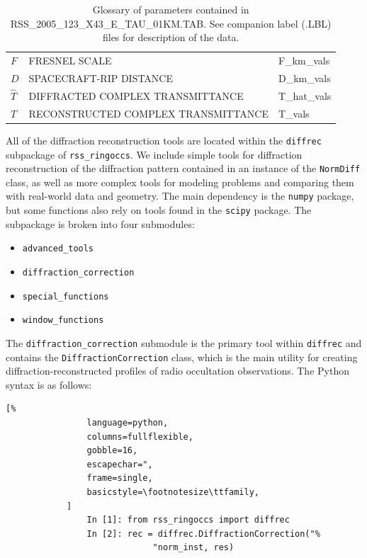 \documentclass[titlepage, 12pt]{article}
\begin{document}
\begin{table}[H]
{\begin{tabular}{l l l}
                        $F$&FRESNEL SCALE&F\_km\_vals\\
                        $D$&SPACECRAFT-RIP DISTANCE&D\_km\_vals\\
                        $\hat{T}$&DIFFRACTED COMPLEX TRANSMITTANCE&
                        T\_hat\_vals\\
                        $T$&RECONSTRUCTED COMPLEX TRANSMITTANCE&
                        T\_vals\\
                        \hline
                    \end{tabular}
                }
                \caption[Glossary of parameters in TAU file]{%
                    Glossary of parameters contained in
                    RSS\_2005\_123\_X43\_E\_TAU\_01KM.TAB.
                    See companion label
                    (.LBL) files for description of the data.
                }
                \label{tab:easydata_parameters_from_tau_file}
            \end{table}
            All of the diffraction reconstruction tools are located
            within the \texttt{diffrec} subpackage of
            \texttt{rss\_ringoccs}. We include simple tools for
            diffraction reconstruction of the diffraction
            pattern contained in an instance of the \texttt{NormDiff}
            class, as well as more complex tools for modeling problems
            and comparing them with real-world data and geometry.
            The main dependency is the \texttt{numpy} package,
            but some functions also rely on tools found in the
            \texttt{scipy} package. The subpackage is broken into four
            submodules:
            \begin{itemize}[itemsep=0pt]
                \item \texttt{advanced\_tools}
                \item \texttt{diffraction\_correction}
                \item \texttt{special\_functions}
                \item \texttt{window\_functions}
            \end{itemize}
            The \texttt{diffraction\_correction} submodule is the primary
            tool within \texttt{diffrec} and contains the
            \texttt{DiffractionCorrection} class, which is the main utility
            for creating diffraction-reconstructed profiles of radio occultation
            observations. The Python syntax is as follows:
            \begin{lstlisting}[%
                language=python,
                columns=fullflexible,
                gobble=16,
                escapechar=",
                frame=single,
                basicstyle=\footnotesize\ttfamily,
            ]
                In [1]: from rss_ringoccs import diffrec
                In [2]: rec = diffrec.DiffractionCorrection("%
                             "norm_inst, res)
            \end{lstlisting}
\end{document}
